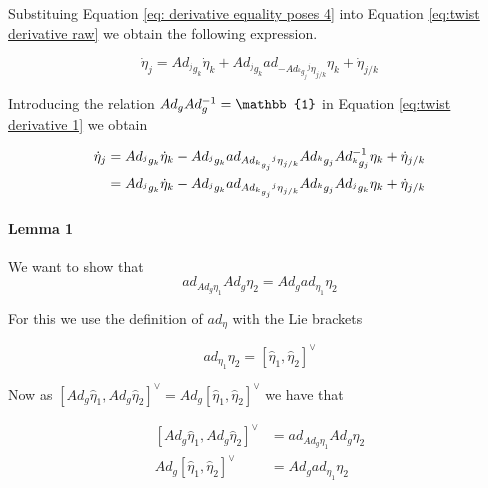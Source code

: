 \documentclass[12pt,a4paper]{book}
\begin{document}
Substituing Equation \eqref{eq: derivative equality poses 4} into Equation \eqref{eq:twist derivative raw} we obtain the following expression.

\begin{equation}\label{eq:twist derivative 1}
	\dot{\eta}_j = Ad_{^jg_k} \dot{\eta}_k + Ad_{^jg_k} ad_{- Ad_{^kg_j} {^j {\eta}}_{j/k}} \eta_k + \dot{\eta}_{j/k} 
\end{equation}

Introducing the relation $Ad_g Ad_g\inv = \mathbb{1}$ in Equation \eqref{eq:twist derivative 1} we obtain

\begin{equation}\label{eq:twist derivative 2}
\begin{aligned}
	\dot{\eta}_j 	&= Ad_{^jg_k} \dot{\eta}_k - Ad_{^jg_k} ad_{Ad_{^kg_j} {^j {\eta}}_{j/k}} Ad_{^kg_j} Ad_{^kg_j} ^{-1} \eta_k + \dot{\eta}_{j/k} \\ 
					&= Ad_{^jg_k} \dot{\eta}_k - Ad_{^jg_k} ad_{Ad_{^kg_j} {^j {\eta}}_{j/k}} Ad_{^kg_j} Ad_{^jg_k} \eta_k + \dot{\eta}_{j/k} 
\end{aligned}
\end{equation}


\paragraph{Lemma 1}
We want to show that 
\begin{equation}
	ad_{Ad_g \eta_1} Ad_g \eta_2 = Ad_g ad_{\eta_1} \eta_2
\end{equation}

For this we use the definition of $ad_\eta$ with the Lie brackets

\begin{equation}
	ad_{\eta_1}\eta_2 = \left[\hat{\eta}_1, \hat{\eta}_2 \right]^\vee
\end{equation}

Now as $\left[Ad_g \hat{\eta}_1, Ad_g  \hat{\eta}_2 \right]^\vee = Ad_g  \left[\hat{\eta}_1, \hat{\eta}_2 \right]^\vee$
we have that 

\begin{equation}
\begin{aligned}
	\left[Ad_g \hat{\eta}_1, Ad_g  \hat{\eta}_2 \right]^\vee &= ad_{Ad_g\eta_1} Ad_g \eta_2 \\
	Ad_g  \left[\hat{\eta}_1, \hat{\eta}_2 \right]^\vee		&= Ad_g ad_{\eta_1}\eta_2
\end{aligned}
\end{equation}
\end{document}
